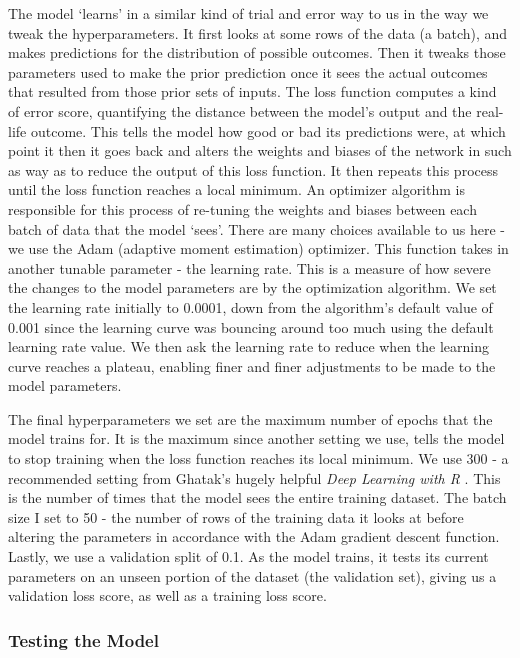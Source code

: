 The model `learns' in a similar kind of trial and error way to us in the way we tweak the hyperparameters. It first looks at some rows of the data (a batch), and makes predictions for the distribution of possible outcomes. Then it tweaks those parameters used to make the prior prediction once it sees the actual outcomes that resulted from those prior sets of inputs. The loss function computes a kind of error score, quantifying the distance between the model's output and the real-life outcome. This tells the model how good or bad its predictions were, at which point it then it goes back and alters the weights and biases of the network in such as way as to reduce the output of this loss function. It then repeats this process until the loss function reaches a local minimum. An optimizer algorithm is responsible for this process of re-tuning the weights and biases between each batch of data that the model `sees'. There are many choices available to us here - we use the Adam (adaptive moment estimation) optimizer. This function takes in another tunable parameter - the learning rate. This is a measure of how severe the changes to the model parameters are by the optimization algorithm. We set the learning rate initially to 0.0001, down from the algorithm's default value of 0.001 since the learning curve was bouncing around too much using the default learning rate value. We then ask the learning rate to reduce when the learning curve reaches a plateau, enabling finer and finer adjustments to be made to the model parameters.

The final hyperparameters we set are the maximum number of epochs that the model trains for. It is the maximum since another setting we use, tells the model to stop training when the loss function reaches its local minimum. We use 300 - a recommended setting from Ghatak's hugely helpful \textit{Deep Learning with R} \cite{ghatak_deep_2019}. This is the number of times that the model sees the entire training dataset. The batch size I set to 50 - the number of rows of the training data it looks at before altering the parameters in accordance with the Adam gradient descent function. Lastly, we use a validation split of 0.1. As the model trains, it tests its current parameters on an unseen portion of the dataset (the validation set), giving us a validation loss score, as well as a training loss score.

\subsubsection{Testing the Model}

